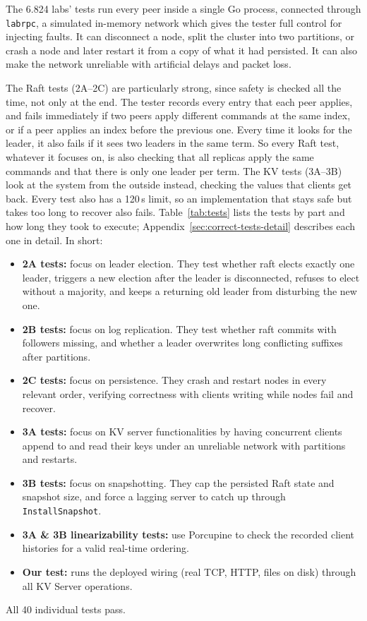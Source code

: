 \documentclass[conference]{IEEEtran}
\begin{document}
The 6.824 labs' tests run every peer inside a single Go process, connected through \texttt{labrpc}, a simulated in-memory network which gives the tester full control for injecting faults. It can disconnect a node, split the cluster into two partitions, or crash a node and later restart it from a copy of what it had persisted. It can also make the network unreliable with artificial delays and packet loss.

The Raft tests (2A--2C) are particularly strong, since safety is checked all the time, not only at the end. The tester records every entry that each peer applies, and fails immediately if two peers apply different commands at the same index, or if a peer applies an index before the previous one. Every time it looks for the leader, it also fails if it sees two leaders in the same term. So every Raft test, whatever it focuses on, is also checking that all replicas apply the same commands and that there is only one leader per term. The KV tests (3A--3B) look at the system from the outside instead, checking the values that clients get back. Every test also has a 120\,s limit, so an implementation that stays safe but takes too long to recover also fails. Table~\ref{tab:tests} lists the tests by part and how long they took to execute; Appendix~\ref{sec:correct-tests-detail} describes each one in detail. In short:

\begin{itemize}
\item \textbf{2A tests:} focus on leader election. They test whether raft elects exactly one leader, triggers a new election after the leader is disconnected, refuses to elect without a majority, and keeps a returning old leader from disturbing the new one.
\item \textbf{2B tests:} focus on log replication. They test whether raft commits with followers missing, and whether a leader overwrites long conflicting suffixes after partitions.
\item \textbf{2C tests:} focus on persistence. They crash and restart nodes in every relevant order, verifying correctness with clients writing while nodes fail and recover.
\item \textbf{3A tests:} focus on KV server functionalities by having concurrent clients append to and read their keys under an unreliable network with partitions and restarts.
\item \textbf{3B tests:} focus on snapshotting. They cap the persisted Raft state and snapshot size, and force a lagging server to catch up through \texttt{InstallSnapshot}.
\item \textbf{3A \& 3B linearizability tests:} use Porcupine to check the recorded client histories for a valid real-time ordering.
\item \textbf{Our test:} runs the deployed wiring (real TCP, HTTP, files on disk) through all KV Server operations.
\end{itemize}
All 40 individual tests pass.
\end{document}

